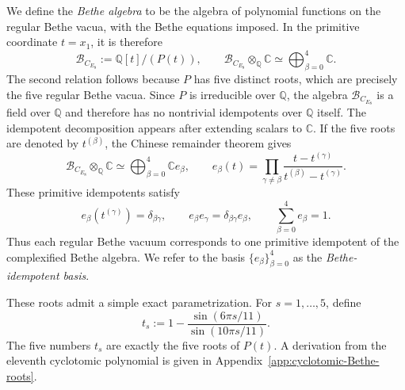 \documentclass[11pt,a4paper]{article}
\numberwithin{equation}{section}
\begin{document}
We define the \emph{Bethe algebra} to be the algebra of polynomial functions on the regular Bethe vacua, with the Bethe equations imposed.  In the primitive coordinate $t=x_1$, it is therefore
\begin{equation}
  \mathcal B_{C_{E_8}}
  :=\mathbb Q[t]/(P(t)),
  \qquad
  \mathcal B_{C_{E_8}}\otimes_{\mathbb Q}\mathbb C
  \simeq
  \bigoplus_{\beta=0}^{4}\mathbb C.
  \label{eq:CE8-Bethe-algebra}
\end{equation}
The second relation follows because $P$ has five distinct roots, which are precisely the five regular Bethe vacua.  Since $P$ is irreducible over $\mathbb Q$, the algebra $\mathcal B_{C_{E_8}}$ is a field over $\mathbb Q$ and therefore has no nontrivial idempotents over $\mathbb Q$ itself.  The idempotent decomposition appears after extending scalars to $\mathbb C$.  If the five roots are denoted by $t^{(\beta)}$, the Chinese remainder theorem gives
\begin{equation}
  \mathcal B_{C_{E_8}}\otimes_{\mathbb Q}\mathbb C
  \simeq
  \bigoplus_{\beta=0}^{4}\mathbb C e_\beta,
  \qquad
  e_\beta(t)
  =\prod_{\gamma\neq\beta}
  \frac{t-t^{(\gamma)}}{t^{(\beta)}-t^{(\gamma)}}.
  \label{eq:CE8-Bethe-idempotents}
\end{equation}
These primitive idempotents satisfy
\begin{equation}
  e_\beta\!\left(t^{(\gamma)}\right)=\delta_{\beta\gamma},
  \qquad
  e_\beta e_\gamma=\delta_{\beta\gamma}e_\beta,
  \qquad
  \sum_{\beta=0}^{4}e_\beta=1.
  \label{eq:CE8-Bethe-idempotent-relations}
\end{equation}
Thus each regular Bethe vacuum corresponds to one primitive idempotent of the complexified Bethe algebra.  We refer to the basis $\{e_\beta\}_{\beta=0}^{4}$ as the \emph{Bethe-idempotent basis}.

These roots admit a simple exact parametrization.  For $s=1,\ldots,5$, define
\begin{equation}
  t_s
  :=1-\frac{\sin(6\pi s/11)}{\sin(10\pi s/11)}.
  \label{eq:CE8-Bethe-roots-unordered}
\end{equation}
The five numbers $t_s$ are exactly the five roots of $P(t)$.  A derivation from the eleventh cyclotomic polynomial is given in Appendix~\ref{app:cyclotomic-Bethe-roots}.
\end{document}
